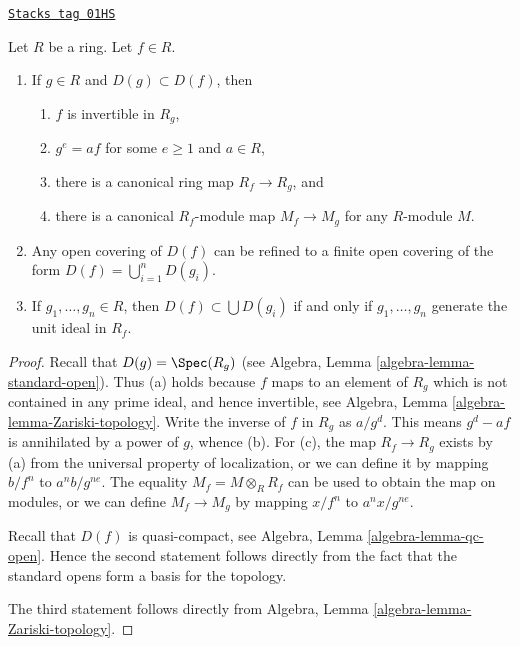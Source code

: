 \begin{lemma}
\label{schemes-lemma-standard-open}
\href{https://stacks.math.columbia.edu/tag/01HS}{\texttt{Stacks tag 01HS}}

Let $R$ be a ring. Let $f \in R$.
\begin{enumerate}
\item If $g\in R$ and $D(g) \subset D(f)$, then
\begin{enumerate}
\item $f$ is invertible in $R_g$,
\item $g^e = af$ for some $e \geq 1$ and $a \in R$,
\item there is a canonical ring map $R_f \to R_g$, and
\item there is a canonical $R_f$-module map
$M_f \to M_g$ for any $R$-module $M$.
\end{enumerate}
\item Any open covering of $D(f)$ can be refined to a finite
open covering of the form $D(f) = \bigcup_{i = 1}^n D(g_i)$.
\item If $g_1, \ldots, g_n \in R$, then $D(f) \subset \bigcup D(g_i)$
if and only if $g_1, \ldots, g_n$ generate the unit ideal in $R_f$.
\end{enumerate}
\end{lemma}

\begin{proof}
Recall that $D(g) = \Spec(R_g)$ (see
Algebra, Lemma \ref{algebra-lemma-standard-open}).
Thus (a) holds because $f$
maps to an element of $R_g$ which is not
contained in any prime ideal, and hence invertible,
see Algebra, Lemma \ref{algebra-lemma-Zariski-topology}.
Write the inverse of $f$ in $R_g$ as $a/g^d$.
This means $g^d - af$ is annihilated by a power of $g$, whence (b).
For (c), the map $R_f \to R_g$ exists by (a) from the universal property
of localization, or we can define it by mapping $b/f^n$
to $a^nb/g^{ne}$. The equality $M_f = M \otimes_R R_f$
can be used to obtain the map on modules, or
we can define $M_f \to M_g$ by mapping
$x/f^n$ to $a^nx/g^{ne}$.

\medskip\noindent
Recall that $D(f)$ is quasi-compact, see
Algebra, Lemma \ref{algebra-lemma-qc-open}.
Hence the second statement follows directly
from the fact that the standard opens form
a basis for the topology.

\medskip\noindent
The third statement follows directly from
Algebra, Lemma \ref{algebra-lemma-Zariski-topology}.
\end{proof}

